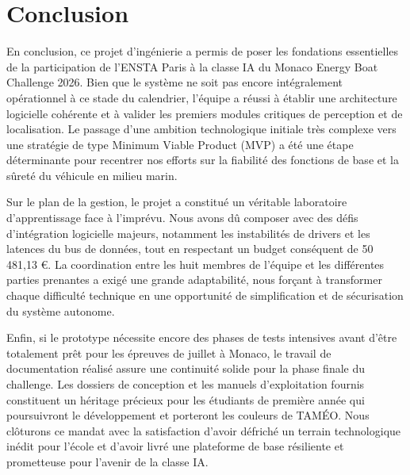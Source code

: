 \documentclass[11pt, a4paper]{article}
\begin{document}
\section{Conclusion}
En conclusion, ce projet d'ingénierie a permis de poser les fondations essentielles de la participation de l'ENSTA Paris à la classe IA du Monaco Energy Boat Challenge 2026. Bien que le système ne soit pas encore intégralement opérationnel à ce stade du calendrier, l'équipe a réussi à établir une architecture logicielle cohérente et à valider les premiers modules critiques de perception et de localisation. Le passage d'une ambition technologique initiale très complexe vers une stratégie de type Minimum Viable Product (MVP) a été une étape déterminante pour recentrer nos efforts sur la fiabilité des fonctions de base et la sûreté du véhicule en milieu marin.

Sur le plan de la gestion, le projet a constitué un véritable laboratoire d'apprentissage face à l'imprévu. Nous avons dû composer avec des défis d'intégration logicielle majeurs, notamment les instabilités de drivers et les latences du bus de données, tout en respectant un budget conséquent de 50 481,13 €. La coordination entre les huit membres de l'équipe et les différentes parties prenantes a exigé une grande adaptabilité, nous forçant à transformer chaque difficulté technique en une opportunité de simplification et de sécurisation du système autonome.

Enfin, si le prototype nécessite encore des phases de tests intensives avant d'être totalement prêt pour les épreuves de juillet à Monaco, le travail de documentation réalisé assure une continuité solide pour la phase finale du challenge. Les dossiers de conception et les manuels d'exploitation fournis constituent un héritage précieux pour les étudiants de première année qui poursuivront le développement et porteront les couleurs de TAMÉO. Nous clôturons ce mandat avec la satisfaction d'avoir défriché un terrain technologique inédit pour l'école et d'avoir livré une plateforme de base résiliente et prometteuse pour l'avenir de la classe IA.
\end{document}
